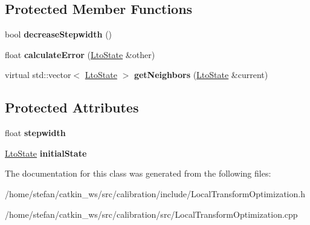 \subsection*{\-Protected \-Member \-Functions}
\begin{DoxyCompactItemize}
\item 
\hypertarget{classLocalTransformOptimization_a2bb7c73654687e884b77854eaad0d94a}{bool {\bfseries decrease\-Stepwidth} ()}\label{classLocalTransformOptimization_a2bb7c73654687e884b77854eaad0d94a}

\item 
\hypertarget{classLocalTransformOptimization_a0c7eb89f2b531e5d618fdbea186d9663}{float {\bfseries calculate\-Error} (\hyperlink{classLtoState}{\-Lto\-State} \&other)}\label{classLocalTransformOptimization_a0c7eb89f2b531e5d618fdbea186d9663}

\item 
\hypertarget{classLocalTransformOptimization_a39cf1ac8cbb3db7d5c8ee2194788b4cc}{virtual std\-::vector$<$ \hyperlink{classLtoState}{\-Lto\-State} $>$ {\bfseries get\-Neighbors} (\hyperlink{classLtoState}{\-Lto\-State} \&current)}\label{classLocalTransformOptimization_a39cf1ac8cbb3db7d5c8ee2194788b4cc}

\end{DoxyCompactItemize}
\subsection*{\-Protected \-Attributes}
\begin{DoxyCompactItemize}
\item 
\hypertarget{classLocalTransformOptimization_a77ed4f8e7e3439eccd1fedbd643a27a9}{float {\bfseries stepwidth}}\label{classLocalTransformOptimization_a77ed4f8e7e3439eccd1fedbd643a27a9}

\item 
\hypertarget{classLocalTransformOptimization_a8d7a4401a591d3274d107e32b1a524e3}{\hyperlink{classLtoState}{\-Lto\-State} {\bfseries initial\-State}}\label{classLocalTransformOptimization_a8d7a4401a591d3274d107e32b1a524e3}

\end{DoxyCompactItemize}


\-The documentation for this class was generated from the following files\-:\begin{DoxyCompactItemize}
\item 
/home/stefan/catkin\-\_\-ws/src/calibration/include/\-Local\-Transform\-Optimization.\-h\item 
/home/stefan/catkin\-\_\-ws/src/calibration/src/\-Local\-Transform\-Optimization.\-cpp\end{DoxyCompactItemize}
